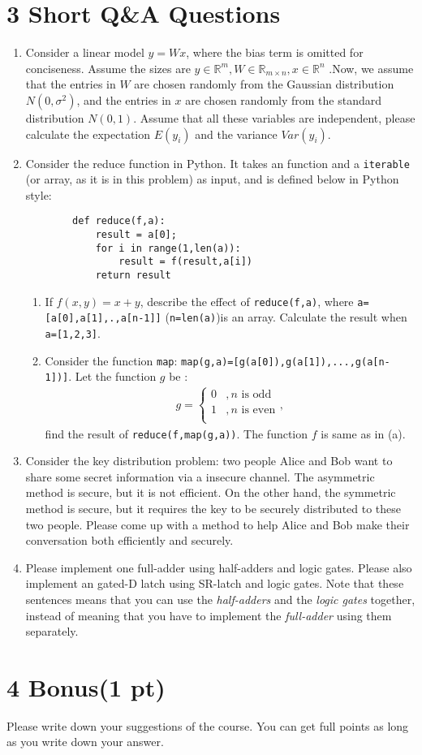 \documentclass{article}
\begin{document}
\section*{3 Short Q\&A Questions}
\begin{enumerate}
    \item Consider a linear model $y=Wx$, where the bias term is omitted for conciseness. Assume the sizes are $y\in \mathbb{R}^m,W\in \mathbb{R}_{m\times n}, x\in \mathbb{R}^n$ .Now, we assume that the entries in $W$ are chosen randomly from the Gaussian distribution $N(0,\sigma^2)$, and the entries in $x$ are chosen randomly from the standard distribution $N(0,1)$. Assume that all these variables are independent, please calculate the expectation $E(y_i)$ and the variance $Var(y_i)$.
    \item Consider the reduce function in Python. It takes an function and a \texttt{iterable} (or array, as it is in this problem) as input, and is defined below in Python style:
    \begin{verbatim}
        def reduce(f,a):
            result = a[0];
            for i in range(1,len(a)):
                result = f(result,a[i])
            return result
    \end{verbatim}
    \begin{enumerate}
        \item If $f(x,y)=x+y$, describe the effect of \texttt{reduce(f,a)}, where \texttt{a=[a[0],a[1],.,a[n-1]]}
 (\texttt{n=len(a)})is an array. Calculate the result when \texttt{a=[1,2,3]}.
 \item Consider the function \texttt{map}: \texttt{map(g,a)=[g(a[0]),g(a[1]),...,g(a[n-1])]}.  Let the function $g$ be :
 \begin{align*}
 g=\begin{cases}
     0&,n\text{ is odd}\\1& ,n\text{ is even}\\
 \end{cases},
 \end{align*}
find the result of \texttt{reduce(f,map(g,a))}. The function $f$ is same as in (a).
\end{enumerate}
    \item Consider the key distribution problem: two people Alice and Bob want to share some secret information via a insecure channel. The asymmetric method is secure, but it is not efficient. On the other hand, the symmetric method is secure, but it requires the key to be securely distributed to these two people. Please come up with a method to help Alice and Bob make their conversation both efficiently and securely.
    \item  Please implement one full-adder using half-adders and logic gates. Please also implement an gated-D latch using SR-latch and logic gates. Note that these sentences means that you can use the \emph{half-adders} and the \emph{logic gates} together, instead of meaning that you have to implement the \emph{full-adder} using them separately.  
\end{enumerate}
\section*{4 Bonus(1 pt)}
Please write down your suggestions of the course. You can get full points as long as you write down your answer.
\end{document}
